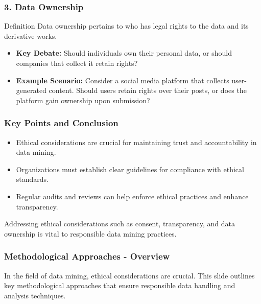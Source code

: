 \documentclass[aspectratio=169]{beamer}
\begin{document}
\begin{frame}[fragile]
    \frametitle{3. Data Ownership}
    \begin{block}{Definition}
        Data ownership pertains to who has legal rights to the data and its derivative works.
    \end{block}
    
    \begin{itemize}
        \item \textbf{Key Debate:}
        Should individuals own their personal data, or should companies that collect it retain rights?
        
        \item \textbf{Example Scenario:}
        Consider a social media platform that collects user-generated content. Should users retain rights over their posts, or does the platform gain ownership upon submission?
    \end{itemize}
\end{frame}

\begin{frame}[fragile]
    \frametitle{Key Points and Conclusion}
    \begin{itemize}
        \item Ethical considerations are crucial for maintaining trust and accountability in data mining.
        \item Organizations must establish clear guidelines for compliance with ethical standards.
        \item Regular audits and reviews can help enforce ethical practices and enhance transparency.
    \end{itemize}
    
    Addressing ethical considerations such as consent, transparency, and data ownership is vital to responsible data mining practices.
\end{frame}

\begin{frame}[fragile]
    \frametitle{Methodological Approaches - Overview}
    In the field of data mining, ethical considerations are crucial. This slide outlines key methodological approaches that ensure responsible data handling and analysis techniques.
\end{frame}
\end{document}
